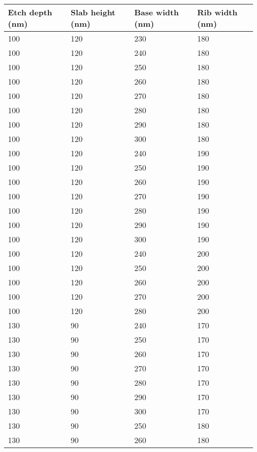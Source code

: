\documentclass[../report.tex]{subfiles}
\begin{document}
\begin {table}[H]
\begin{center} 
	\begin{tabular}{ | m{6em} | m{6em}| m{6em} | m{6em} | }  
		\hline
		\textbf{Etch depth (nm)} & \textbf{Slab height (nm)} & \textbf{Base width (nm)} & \textbf{Rib width (nm)} \\
		\hline\hline
		100 & 120 & 230 & 180 \\
		\hline
		100 & 120 & 240 & 180 \\ 
		\hline
		100 & 120 & 250 & 180 \\ 
		\hline
		100 & 120 & 260 & 180 \\ 
		\hline
		100 & 120 & 270 & 180 \\ 
		\hline
		100 & 120 & 280 & 180 \\ 
		\hline
		100 & 120 & 290 & 180 \\ 
		\hline
		100 & 120 & 300 & 180 \\ 
		\hline
		100 & 120 & 240 & 190 \\ 
		\hline
		100 & 120 & 250 & 190 \\ 
		\hline
		100 & 120 & 260 & 190 \\ 
		\hline
		100 & 120 & 270 & 190 \\ 
		\hline
		100 & 120 & 280 & 190 \\ 
		\hline
		100 & 120 & 290 & 190 \\ 
		\hline
		100 & 120 & 300 & 190 \\ 
		\hline	
		100 & 120 & 240 & 200 \\ 
		\hline
		100 & 120 & 250 & 200 \\ 
		\hline
		100 & 120 & 260 & 200 \\ 
		\hline	
		100 & 120 & 270 & 200 \\ 
		\hline
		100 & 120 & 280 & 200 \\ 
		\hline
		130 & 90 & 240 & 170 \\ 
		\hline
		130 & 90 & 250 & 170 \\ 
		\hline
		130 & 90 & 260 & 170 \\ 
		\hline
		130 & 90 & 270 & 170 \\ 
		\hline
		130 & 90 & 280 & 170 \\ 
		\hline
		130 & 90 & 290 & 170 \\ 
		\hline
		130 & 90 & 300 & 170 \\ 
		\hline
		130 & 90 & 250 & 180 \\ 
		\hline
		130 & 90 & 260 & 180 \\ 

\end{tabular}
\end{center}
\end{table}
\end{document}
